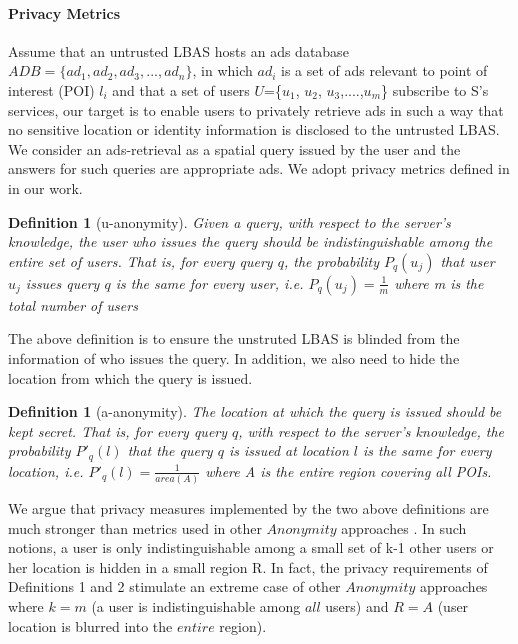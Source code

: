 \paragraph{Privacy Metrics}
Assume that an untrusted  LBAS hosts an ads database $ADB = \{ad_1, ad_2, ad_3, ..., ad_n\}$, in which $ad_i$ is a set of ads relevant to point of interest (POI) $l_i$ and that a set of users $U$=\{$u_1$, $u_2$, $u_3$,....,$u_m$\} subscribe to S's services, our target is to enable users to privately retrieve ads in such a way that no sensitive location or identity information is disclosed to the untrusted LBAS. We consider an ads-retrieval as a spatial query issued by the user and the answers for such queries are appropriate ads. We adopt privacy metrics defined in \cite{Spiral} in our work.

\newtheorem{u-anonymity}[defi]{Definition}
\begin{u-anonymity}
[u-anonymity] 
Given a query, with respect to the server's knowledge, the user who issues the query should be indistinguishable among the entire set of users. That is, for every query $q$, the probability $P_q(u_j)$ that user $u_j$ issues query $q$ is the same for every user, i.e.
$P_q(u_j) = \frac{1}{m}$ where m is the total number of users
\end{u-anonymity}

The above definition is to ensure the unstruted LBAS is blinded from the information of who issues the query. In addition, we also need to hide the location from which the query is issued.

\newtheorem{a-anonymity}[defi]{Definition}
\begin{a-anonymity}
[a-anonymity] 
The location at which the query is issued should be kept secret. That is, for every query $q$, with respect to the server's knowledge, the probability $P'_q(l)$ that the query $q$ is issued at location $l$ is the same for every location, i.e.  $P'_q(l) = \frac{1}{area(A)}$ where A is the entire region covering all POIs.
\end{a-anonymity}

We argue that privacy measures implemented by the two above definitions are much stronger than metrics used in other $Anonymity$ approaches \cite{k-anonymity1, k-anonymity2, New_Casper}. In such notions, a user is only indistinguishable among a small set of k-1 other users or her location is hidden in a small region R. In fact, the privacy requirements of Definitions 1 and 2 stimulate an extreme case of other $Anonymity$ approaches where $k=m$ (a user is indistinguishable among $all$ users) and $R=A$ (user location is blurred into the $entire$ region). 

